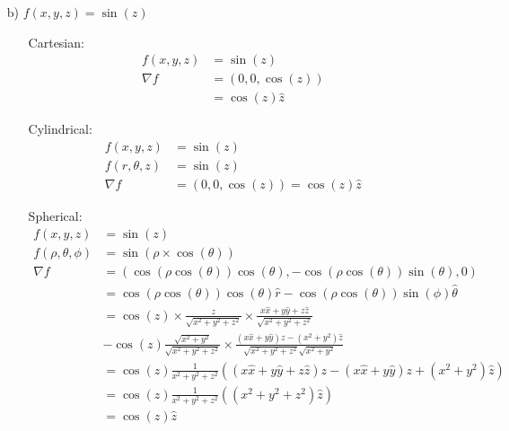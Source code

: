 \documentclass{article}
\begin{document}
\begin{itemize}
\begin{itemize}
\begin{itemize}
        \end{itemize}\newpage
        \item [b)]  \(f(x,y,z)=\sin(z)\)
        \begin{itemize}
            \item [Cartesian:] 
            \begin{align*}
                f(x,y,z)&=\sin(z)\\
                \nabla f&=\left(0,0,\cos(z)\right)\\
                &=\cos(z)\hat z
            \end{align*}
            \item [Cylindrical:]
            \begin{align*}
                f(x,y,z)&=\sin(z)\\
                f(r,\theta,z)&=\sin(z)\\
                \nabla f&=\left(0,0,\cos(z)\right) = \cos(z)\hat z
            \end{align*}
            \item [Spherical:]
            \begin{align*}
                f(x,y,z)&=\sin(z)\\
                f(\rho,\theta,\phi)&=\sin(\rho\times \cos(\theta))\\
                \nabla f&=\left(\cos(\rho \cos(\theta))\cos(\theta),-\cos(\rho \cos(\theta))\sin(\theta),0\right)\\
                &=\cos(\rho \cos(\theta))\cos(\theta) \hat{r}-\cos(\rho \cos(\theta))\sin(\phi)\hat{\theta}\\
                &=\cos(z)\times \frac{z}{\sqrt{x^2+y^2+z^2}} \times \frac{x\hat{x}+y\hat{y}+z\hat z}{\sqrt{x^2+y^2+z^2}}\\
                &-\cos(z)\frac{\sqrt{x^2+y^2}}{\sqrt{x^2+y^2+z^2}}\times \frac{(x\hat x +y\hat y)z-(x^2+y^2)\hat z}{\sqrt{x^2+y^2+z^2}\sqrt{x^2+y^2}}\\
                &=\cos(z)\frac{1}{x^2+y^2+z^2}\left((x\hat{x}+y\hat{y}+z\hat z)z-(x\hat x +y\hat y)z+(x^2+y^2)\hat z\right)\\
                &=\cos(z)\frac{1}{x^2+y^2+z^2}\left((x^2+y^2+z^2)\hat z\right)\\
                &=\cos(z)\hat z
            \end{align*}
        \end{itemize}




\end{itemize}
\end{itemize}
\end{document}
